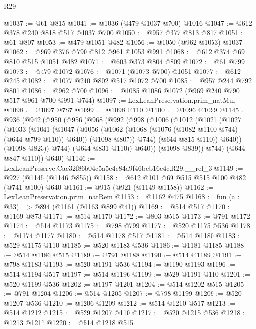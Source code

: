 \begin{lexlean}{R29}
\begin{coremodule}
@1037 := @61 @815
@1041 := @1036 (@479 @1037 @700) @1016
@1047 := @612 @378 @240 @818 @517 @1037 @700
@1050 := @957 @377 @813 @817
@1051 := @61 @807
@1053 := @479 @1051 @482
@1056 := @1050 (@962 @1053) @1037
@1062 := @969 @376 @790 @812 @961 @1053 @991
@1068 := @612 @374 @69 @810 @515 @1051 @482
@1071 := @603 @373 @804 @809
@1072 := @61 @799
@1073 := @479 @1072
@1076 := @1071 (@1073 @700) @1051
@1077 := @612 @245
@1082 := @1077 @240 @802 @517 @1072 @700
@1085 := @957 @244 @792 @801
@1086 := @962 @700
@1096 := @1085 @1086 @1072 (@969 @240 @790 @517 @961 @700 @991 @744)
@1097 := LexLeanPreservation.prim_natMul
@1098 := @1097 @787
@1099 := @1098 @110
@1100 := @1096 @1099
@1145 := @936
    (@942
      (@950
        (@956
          (@968
            (@992
              (@998
                (@1006
                  (@1012
                    (@1021
                      (@1027
                        (@1033
                          (@1041
                            (@1047
                              (@1056
                                (@1062 (@1068 (@1076 (@1082 @1100 @744) (@644 @799 @110)) @640))
                                (@1098 @807))
                              @744)
                            (@644 @815 @110))
                          @640))
                      (@1098 @823))
                    @744)
                  (@644 @831 @110))
                @640))
            (@1098 @839))
          @744)
        (@644 @847 @110))
      @640)
@1146 := LexLeanPreserve.Cac32f86b04c5a5e4c84d9f46beb16e4c.R29.__rel_3
@1149 := @927 (@1145 (@1146 @855))
@1158 := @612 @101 @69 @515 @515 @100 @482 (@741 @100) @640
@1161 := @915 (@921 (@1149 @1158))
@1162 := LexLeanPreservation.prim_natRem
@1163 := @1162 @475
@1168 := fun (a : @33) => @894 (@1161 (@1163 @899 @41))
@1169 := @514 @517
@1170 := @1169 @873
@1171 := @514 @1170
@1172 := @803 @515
@1173 := @791 @1172
@1174 := @514 @1173
@1175 := @798 @799
@1177 := @520 @1175 @536
@1178 := @1174 @1177
@1180 := @514 @1178 @517
@1181 := @514 @1180
@1183 := @529 @1175 @110
@1185 := @520 @1183 @536
@1186 := @1181 @1185
@1188 := @514 @1186 @515
@1189 := @791 @1188
@1190 := @514 @1189
@1191 := @798 @1183
@1193 := @520 @1191 @536
@1194 := @1190 @1193
@1196 := @514 @1194 @517
@1197 := @514 @1196
@1199 := @529 @1191 @110
@1201 := @520 @1199 @536
@1202 := @1197 @1201
@1204 := @514 @1202 @515
@1205 := @791 @1204
@1206 := @514 @1205
@1207 := @798 @1199
@1209 := @520 @1207 @536
@1210 := @1206 @1209
@1212 := @514 @1210 @517
@1213 := @514 @1212
@1215 := @529 @1207 @110
@1217 := @520 @1215 @536
@1218 := @1213 @1217
@1220 := @514 @1218 @515

\end{coremodule}
\end{lexlean}
